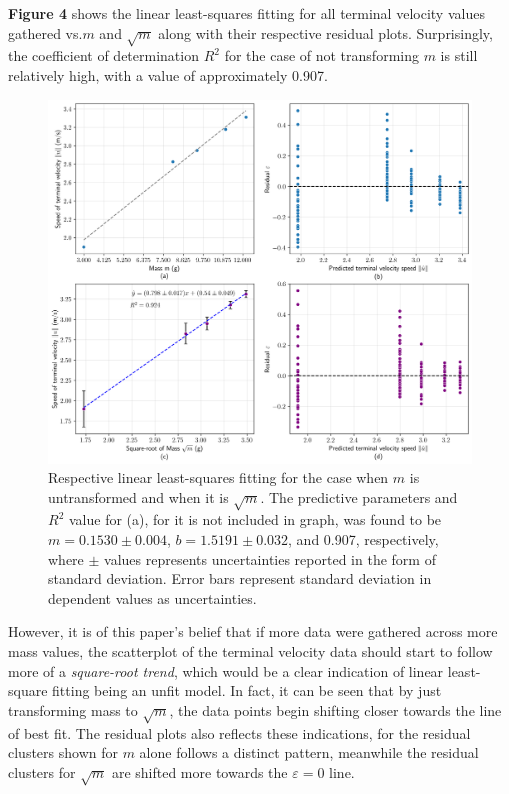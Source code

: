 \documentclass[12pt]{article}
\begin{document}
\begin{multicols}{2}
\textbf{Figure 4} shows the linear least-squares fitting for all terminal velocity values gathered vs.\;$m$ and $\sqrt{m}$ along with their respective residual plots.
Surprisingly, the coefficient of determination $R^2$ for the case of not transforming $m$ is still relatively high, with a value of approximately 0.907.
\begin{figure}[H]
    \centering
    \includegraphics[width=0.98\linewidth]{figs/figure4.png}
    \caption{
        Respective linear least-squares fitting for the case when $m$ is untransformed and when it is $\sqrt{m}$.
        The predictive parameters and $R^2$ value for (a), for it is not included in graph,
        was found to be $m=0.1530\pm0.004$, $b=1.5191\pm0.032$, and 0.907, respectively,
        where $\pm$ values represents uncertainties reported in the form of standard deviation.
        Error bars represent standard deviation in dependent values as uncertainties.
    }
    \label{fig:4}
\end{figure}
\noindent
However, it is of this paper's belief that if more data were gathered across more mass values,
the scatterplot of the terminal velocity data should start to follow more of a \textit{square-root trend}, which would be a clear indication of linear least-square fitting being an unfit model.
In fact, it can be seen that by just transforming mass to $\sqrt{m}$, the data points begin shifting closer towards the line of best fit.
The residual plots also reflects these indications, for the residual clusters shown for $m$ alone follows a distinct pattern,
meanwhile the residual clusters for $\sqrt{m}$ are shifted more towards the $\varepsilon=0$ line.


\end{multicols}
\end{document}
